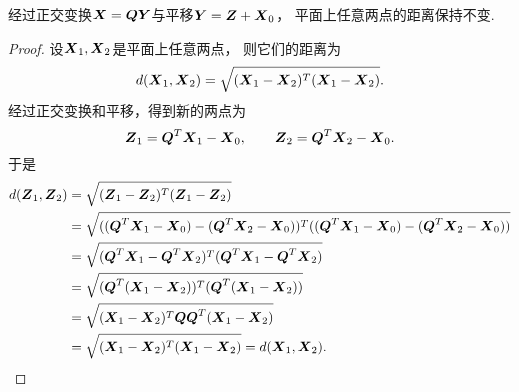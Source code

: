 \begin{lemma}
经过正交变换\(\boldsymbol{X} = \boldsymbol{Q} \boldsymbol{Y}\)与平移\(\boldsymbol{Y} = \boldsymbol{Z} + \boldsymbol{X}_0\)，
平面上任意两点的距离保持不变.
\begin{proof}
设\(\boldsymbol{X}_1,\boldsymbol{X}_2\)是平面上任意两点，
则它们的距离为\begin{equation*}
	d(\boldsymbol{X}_1,\boldsymbol{X}_2)
	= \sqrt{(\boldsymbol{X}_1-\boldsymbol{X}_2)^T(\boldsymbol{X}_1-\boldsymbol{X}_2)}.
\end{equation*}
经过正交变换和平移，得到新的两点为\begin{equation*}
	\boldsymbol{Z}_1 = \boldsymbol{Q}^T \boldsymbol{X}_1 - \boldsymbol{X}_0,
	\qquad
	\boldsymbol{Z}_2 = \boldsymbol{Q}^T \boldsymbol{X}_2 - \boldsymbol{X}_0.
\end{equation*}
于是\begin{align*}
	d(\boldsymbol{Z}_1,\boldsymbol{Z}_2)
	&= \sqrt{(\boldsymbol{Z}_1-\boldsymbol{Z}_2)^T(\boldsymbol{Z}_1-\boldsymbol{Z}_2)} \\
	&= \sqrt{
		((\boldsymbol{Q}^T \boldsymbol{X}_1 - \boldsymbol{X}_0) - (\boldsymbol{Q}^T \boldsymbol{X}_2 - \boldsymbol{X}_0))^T
		((\boldsymbol{Q}^T \boldsymbol{X}_1 - \boldsymbol{X}_0) - (\boldsymbol{Q}^T \boldsymbol{X}_2 - \boldsymbol{X}_0))
	} \\
	&= \sqrt{
		(\boldsymbol{Q}^T \boldsymbol{X}_1 - \boldsymbol{Q}^T \boldsymbol{X}_2)^T
		(\boldsymbol{Q}^T \boldsymbol{X}_1 - \boldsymbol{Q}^T \boldsymbol{X}_2)
	} \\
	&= \sqrt{
		(\boldsymbol{Q}^T (\boldsymbol{X}_1 - \boldsymbol{X}_2))^T
		(\boldsymbol{Q}^T (\boldsymbol{X}_1 - \boldsymbol{X}_2))
	} \\
	&= \sqrt{
		(\boldsymbol{X}_1 - \boldsymbol{X}_2)^T
		\boldsymbol{Q} \boldsymbol{Q}^T
		(\boldsymbol{X}_1 - \boldsymbol{X}_2)
	} \\
	&= \sqrt{
		(\boldsymbol{X}_1 - \boldsymbol{X}_2)^T
		(\boldsymbol{X}_1 - \boldsymbol{X}_2)
	}
	= d(\boldsymbol{X}_1,\boldsymbol{X}_2).
	\qedhere
\end{align*}
\end{proof}
\end{lemma}

